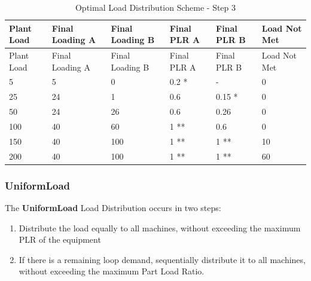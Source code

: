 \begin{longtable}[c]{|l|l|l|l|l|l|}
    \caption{Optimal Load Distribution Scheme - Step 3}
    \label{tab:optimal-load-step-3}\\
\hline
Plant Load & Final Loading A & Final Loading B & Final PLR A & Final PLR B & Load Not Met \\ \hline
\endfirsthead

\hline
Plant Load & Final Loading A & Final Loading B & Final PLR A & Final PLR B & Load Not Met \\ \hline
\endhead

5 & 5 & 0 & 0.2 * & - & 0 \\ \hline
25 & 24 & 1 & 0.6 & 0.15 * & 0 \\ \hline
50 & 24 & 26 & 0.6 & 0.26 & 0 \\ \hline
100 & 40 & 60 & 1 ** & 0.6 & 0 \\ \hline
150 & 40 & 100 & 1 ** & 1 ** & 10 \\ \hline
200 & 40 & 100 & 1 ** & 1 ** & 60 \\ \hline
\end{longtable}




\subsubsection{UniformLoad}%
\label{ssub:uniformload}

The \textbf{UniformLoad} Load Distribution occurs in two steps:

\begin{enumerate}
    \def\labelenumi{Step \arabic{enumi}:}
\item
    Distribute the load equally to all machines, without exceeding the maximum PLR of the equipment
\item
    If there is a remaining loop demand, sequentially distribute it to all machines, without exceeding the maximum Part Load Ratio.
\end{enumerate}


